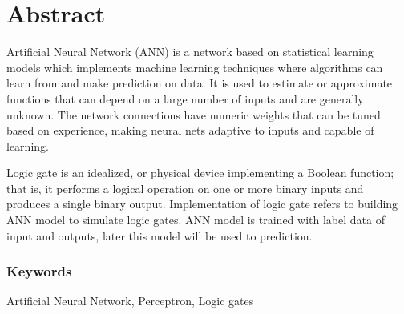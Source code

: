 \section*{Abstract}
Artificial Neural Network (ANN) is a network based on statistical learning models which implements machine learning techniques where algorithms can learn from and make prediction on data. It is used to estimate or approximate functions that can depend on a large number of inputs and are generally unknown.
 The network connections have numeric weights that can be tuned based on experience, making neural nets adaptive to inputs and capable of learning.
 
Logic gate is an idealized, or physical device implementing a Boolean function; that is, it performs a logical operation on one or more binary inputs and produces a single binary output. Implementation of logic gate refers to building ANN model to simulate logic gates. ANN model is trained with label data of input and outputs, later this model will be used to prediction.

\subsubsection*{Keywords}  
Artificial Neural Network, Perceptron, Logic gates 
\newpage